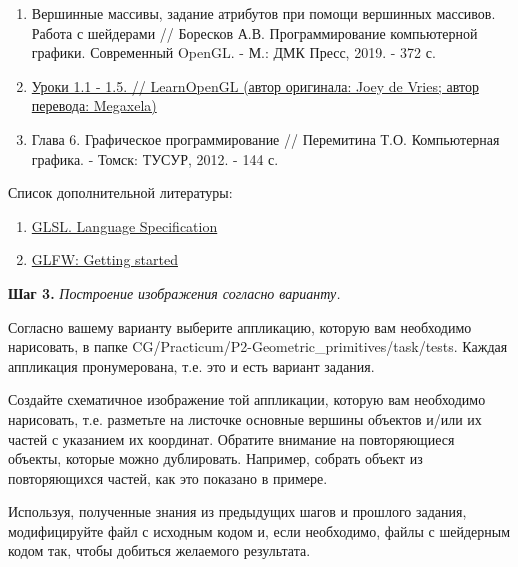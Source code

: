 \documentclass[a4paper,12pt]{article}
\begin{document}
    \begin{enumerate}
        \item 
        Вершинные массивы, задание атрибутов при помощи вершинных массивов. Работа с шейдерами // Боресков А.В. Программирование компьютерной графики. Современный OpenGL. - М.: ДМК Пресс, 2019. - 372 с.
        \item 
        \href{https://habr.com/ru/post/310790/}{Уроки 1.1 - 1.5. // LearnOpenGL (автор оригинала: Joey de Vries; автор перевода: Megaxela)} 
        
        \item
        Глава 6. Графическое программирование // Перемитина Т.О. Компьютерная графика. - Томск: ТУСУР, 2012. - 144 с.
        
        \end{enumerate}

    Список дополнительной литературы:
    
    \begin{enumerate}

    \item 
    \href{https://www.khronos.org/registry/OpenGL/specs/gl/}{GLSL. Language Specification}
    
    \item
    \href{https://www.glfw.org/docs/latest/quick.html}{GLFW: Getting started}

    \end{enumerate}
    
    
    \textbf{Шаг 3.} \textit{Построение изображения согласно варианту.}
    
    Согласно вашему варианту выберите аппликацию, которую вам необходимо нарисовать, в папке \textquotedbl CG/Practicum/P2-Geometric\_primitives/task/tests\textquotedbl. Каждая аппликация пронумерована, т.е. это и есть вариант задания.
    
    Создайте схематичное изображение той аппликации, которую вам необходимо нарисовать, т.е. разметьте на листочке основные вершины объектов и/или их частей с указанием их координат. Обратите внимание на повторяющиеся объекты, которые можно дублировать. Например, собрать объект из повторяющихся частей, как это показано в примере.
    
    Используя, полученные знания из предыдущих шагов и прошлого задания, модифицируйте файл с исходным кодом и, если необходимо, файлы с шейдерным кодом так, чтобы добиться желаемого результата.
\end{document}
